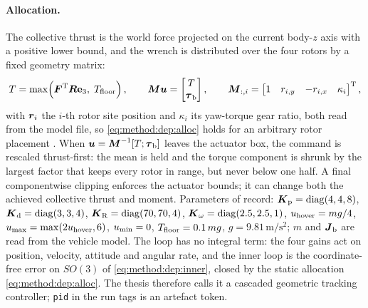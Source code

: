 \paragraph{Allocation.} The collective thrust is the world force projected on the current body-$z$
axis with a positive lower bound, and the wrench is distributed over the
four rotors by a fixed geometry matrix:
\begin{equation}\label{eq:method:dep:alloc}
  T = \max\!\left(\boldsymbol{F}^{\textrm{T}}\boldsymbol{R}\textbf{e}_{3},\;T_{\textrm{floor}}\right),
  \qquad
  \boldsymbol{M}\boldsymbol{u} = \begin{bmatrix}T\\ \boldsymbol{\tau}_{\textrm{b}}\end{bmatrix},
  \qquad
  \boldsymbol{M}_{:,i} = \begin{bmatrix}1 & r_{i,y} & -r_{i,x} & \kappa_{i}\end{bmatrix}^{\textrm{T}},
\end{equation}
with $\boldsymbol{r}_{i}$ the $i$-th rotor site position and $\kappa_{i}$ its yaw-torque gear ratio, both
read from the model file, so \eqref{eq:method:dep:alloc} holds for an arbitrary rotor placement
\parencite[Eq.~(1)]{lee2010geometric}\parencite{mellinger2011minimum}. When
$\boldsymbol{u} = \boldsymbol{M}^{-1}[T;\boldsymbol{\tau}_{\textrm{b}}]$ leaves the actuator box, the command is rescaled
thrust-first: the mean is held and the torque component is shrunk by the largest factor that keeps
every rotor in range, but never below one half. A final componentwise clipping enforces the actuator
bounds; it can change both the achieved collective thrust and moment. Parameters of record:
$\boldsymbol{K}_{\textrm{p}} = \operatorname{diag}(4,4,8)$, $\boldsymbol{K}_{\textrm{d}} = \operatorname{diag}(3,3,4)$,
$\boldsymbol{K}_{\textrm{R}} = \operatorname{diag}(70,70,4)$, $\boldsymbol{K}_{\omega} = \operatorname{diag}(2.5,2.5,1)$,
$u_{\textrm{hover}} = mg/4$, $u_{\textrm{max}} = \max(2u_{\textrm{hover}},6)$, $u_{\textrm{min}} = 0$,
$T_{\textrm{floor}} = 0.1\,mg$, $g = 9.81\,\textrm{m}/\textrm{s}^{2}$; $m$ and $\boldsymbol{J}_{\textrm{b}}$ are
read from the vehicle model.
The loop has no integral term: the four gains act on position, velocity, attitude and angular rate,
and the inner loop is the coordinate-free error on $SO(3)$ of \eqref{eq:method:dep:inner}, closed by
the static allocation \eqref{eq:method:dep:alloc}. The thesis therefore calls it a cascaded geometric
tracking controller; \texttt{pid} in the run tags is an artefact token.

